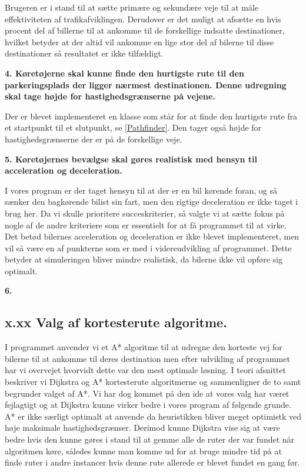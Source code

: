 Brugeren er i stand til at sætte primære og sekundære veje til at måle effektiviteten af trafikafviklingen. Derudover er det muligt at afsætte en hvis procent del af billerne til at ankomme til de forskellige indsatte destinationer, hvilket betyder at der altid vil ankomme en lige stor del af bilerne til disse destinationer så resultatet er ikke tilfældigt.

\vspace{5mm}

\textbf{4. Køretøjerne skal kunne finde den hurtigste rute til den parkeringsplads der ligger nærmest destinationen. Denne udregning skal tage højde for hastighedsgrænserne på vejene.}

Der er blevet implementeret en klasse som står for at finde den hurtigste rute fra et startpunkt til et slutpunkt, se \ref{Pathfinder}. Den tager også højde for hastighedsgrænserne der er på de forskellige veje. 

\vspace{5mm}

\textbf{5. Køretøjernes bevælgse skal gøres realistisk med hensyn til acceleration og deceleration.}

I vores program er der taget hensyn til at der er en bil kørende foran, og så sænker den bagkørende bilist sin fart, men den rigtige deceleration er ikke taget i brug her. Da vi skulle prioritere succeskriterier, så valgte vi at sætte fokus på nogle af de andre kriteriere som er essentielt for at få programmet til at virke. Det betød bilernes acceleration og deceleration er ikke blevet implementeret, men vil så være en af punkterne som er med i videreudvikling af programmet. Dette betyder at simuleringen bliver mindre realistisk, da bilerne ikke vil opføre sig optimalt.

\vspace{5mm}

\textbf{6.}

\subsection{x.xx Valg af kortesterute algoritme.}
I programmet anvender vi et A* algoritme til at udregne den korteste vej for bilerne til at ankomme til deres destination men efter udvikling af programmet har vi overvejet hvorvidt dette var den mest optimale løsning. I teori afsnittet beskriver vi Dijkstra og A* kortesterute algoritmerne og sammenligner de to samt begrunder valget af A*. Vi har dog kommet på den ide at vores valg har været fejlagtigt og at Dijkstra kunne virker bedre i vores program af følgende grunde. A* er ikke særligt optimalt at anvende da heuristikken bliver meget optimistk ved høje maksimale hastighedsgrænser. Derimod kunne Dijkstra vise sig at være bedre hvis den kunne gøres i stand til at gemme alle de ruter der var fundet når algoritmen køre, således kunne man komme ud for at bruge mindre tid på at finde ruter i andre instancer hvis denne rute allerede er blevet fundet en gang før. 

